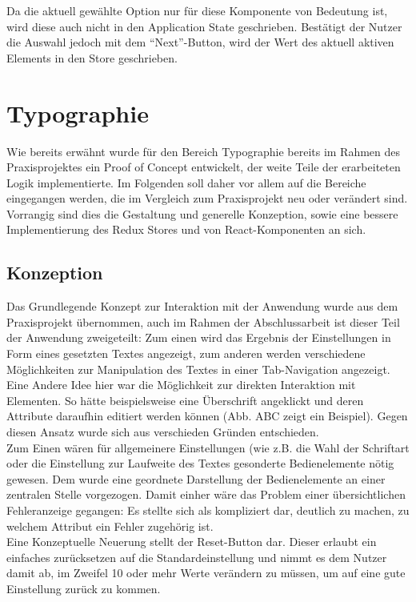Da die aktuell gewählte Option nur für diese Komponente von Bedeutung ist, wird diese auch nicht in den Application State geschrieben. Bestätigt der Nutzer die Auswahl jedoch mit dem “Next”-Button, wird der Wert des aktuell aktiven Elements in den Store geschrieben.


\section{Typographie}
Wie bereits erwähnt wurde für den Bereich Typographie bereits im Rahmen des Praxisprojektes ein Proof of Concept entwickelt, der weite Teile der erarbeiteten Logik implementierte.
Im Folgenden soll daher vor allem auf die Bereiche eingegangen werden, die im Vergleich zum Praxisprojekt neu oder verändert sind. Vorrangig sind dies die Gestaltung und generelle Konzeption, sowie eine bessere Implementierung des Redux Stores und von React-Komponenten an sich.

\subsection{Konzeption}
Das Grundlegende Konzept zur Interaktion mit der Anwendung wurde aus dem Praxisprojekt übernommen, auch im Rahmen der Abschlussarbeit ist dieser Teil der Anwendung zweigeteilt: Zum einen wird das Ergebnis der Einstellungen in Form eines gesetzten Textes angezeigt, zum anderen werden verschiedene Möglichkeiten zur Manipulation des Textes in einer Tab-Navigation angezeigt.\\
Eine Andere Idee hier war die Möglichkeit zur direkten Interaktion mit Elementen. So hätte beispielsweise eine Überschrift angeklickt und deren Attribute daraufhin editiert werden können (Abb. ABC zeigt ein Beispiel). Gegen diesen Ansatz wurde sich aus verschieden Gründen entschieden.\\
Zum Einen wären für allgemeinere Einstellungen (wie z.B. die Wahl der Schriftart oder die Einstellung zur Laufweite des Textes gesonderte Bedienelemente nötig gewesen. Dem wurde eine geordnete Darstellung der Bedienelemente an einer zentralen Stelle vorgezogen. Damit einher wäre das Problem einer übersichtlichen Fehleranzeige gegangen: Es stellte sich als kompliziert dar, deutlich zu machen, zu welchem Attribut ein Fehler zugehörig ist.\\

Eine Konzeptuelle Neuerung stellt der Reset-Button dar. Dieser erlaubt ein einfaches zurücksetzen auf die Standardeinstellung und nimmt es dem Nutzer damit ab, im Zweifel 10 oder mehr Werte verändern zu müssen, um auf eine gute Einstellung zurück zu kommen.\\

